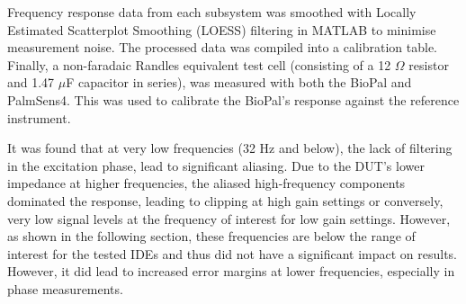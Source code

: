 Frequency response data from each subsystem was smoothed with Locally Estimated Scatterplot Smoothing (LOESS) filtering in MATLAB to minimise measurement noise. The processed data was compiled into a calibration table. Finally, a non-faradaic Randles equivalent test cell (consisting of a 12 $\Omega$ resistor and 1.47 $\mu$F capacitor in series), was measured with both the BioPal and PalmSens4. This was used to calibrate the BioPal's response against the reference instrument. 

It was found that at very low frequencies (32 Hz and below), the lack of filtering in the excitation phase, lead to significant aliasing. Due to the \ac{DUT}'s lower impedance at higher frequencies, the aliased high-frequency components dominated the response, leading to clipping at high gain settings or conversely, very low signal levels at the frequency of interest for low gain settings. However, as shown in the following section, these frequencies are below the range of interest for the tested \acp{IDE} and thus did not have a significant impact on results. However, it did lead to increased error margins at lower frequencies, especially in phase measurements.

